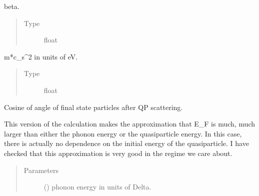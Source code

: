 \documentclass[letterpaper,10pt,english]{sphinxmanual}
\begin{document}
\begin{fulllineitems}

\begin{fulllineitems}
\label{\detokenize{code_structure:scdc.material.Material.beta}}
beta.
\begin{quote}\begin{description}
\item[{Type}] \leavevmode
float

\end{description}\end{quote}

\end{fulllineitems}


\begin{fulllineitems}
\label{\detokenize{code_structure:scdc.material.Material.mcs2}}
m*c\_s\textasciicircum{}2 in units of eV.
\begin{quote}\begin{description}
\item[{Type}] \leavevmode
float

\end{description}\end{quote}

\end{fulllineitems}


\begin{fulllineitems}
\label{\detokenize{code_structure:scdc.material.Material.qp_final_state_angles_approx}}
Cosine of angle of final state particles after QP scattering.

This version of the calculation makes the approximation that E\_F is
much, much larger than either the phonon energy or the quasiparticle
energy. In this case, there is actually no dependence on the initial
energy of the quasiparticle. I have checked that this approximation is
very good in the regime we care about.
\begin{quote}\begin{description}
\item[{Parameters}] \leavevmode
{} () \textendash{} phonon energy in units of Delta.


\end{description}
\end{quote}
\end{fulllineitems}
\end{fulllineitems}
\end{document}
